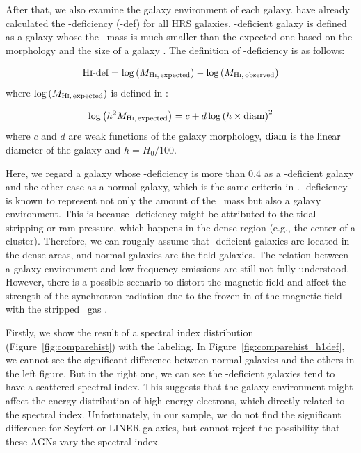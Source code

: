 After that, we also examine the galaxy environment of each galaxy.
\citet{Boselli2014} have already calculated the \nh-deficiency (\nh-def) for all HRS galaxies.
\nh-deficient galaxy is defined as a galaxy whose the \nh~mass is much smaller than the expected one based on the morphology and the size of a galaxy \citep{Haynes1984, Boselli2009}.
The definition of \nh-deficiency is as follows:

\begin{equation}\label{eq:definitionofHIdeficiency}
    \text{H\textsc{i}-def} = \log\left(M_{\mathrm{H\textsc{i},\,expected}}\right) - \log\left(M_{\mathrm{H\textsc{i},\,observed}}\right)
\end{equation}
where $\log\left(M_{\mathrm{H\textsc{i},\,expected}}\right)$ is defined in \citet{Haynes1984}:

\begin{equation}\label{eq:definitionofexpectedHIdef}
    \log\left(h^2 M_{\mathrm{H\textsc{i},\,expected}}\right) = c + d\log\left(h\times\mathrm{diam}\right)^2
\end{equation}
where $c$ and $d$ are weak functions of the galaxy morphology, $\mathrm{diam}$ is the linear diameter of the galaxy and $h=H_0 / 100$.

Here, we regard a galaxy whose \nh-deficiency is more than 0.4 as a \nh-deficient galaxy and the other case as a normal galaxy, which is the same criteria in \citet{Ciesla2016}.
\nh-deficiency is known to represent not only the amount of the \nh~mass but also a galaxy environment.
This is because \nh-deficiency might be attributed to the tidal stripping or ram pressure, which happens in the dense region (e.g., the center of a cluster).
Therefore, we can roughly assume that \nh-deficient galaxies are located in the dense areas, and normal galaxies are the field galaxies.
The relation between a galaxy environment and low-frequency emissions are still not fully understood.
However, there is a possible scenario to distort the magnetic field and affect the strength of the synchrotron radiation due to the frozen-in of the magnetic field with the stripped \nh~gas \citep{Murphy2009}.

Firstly, we show the result of a spectral index distribution (Figure~\ref{fig:comparehist}) with the labeling.
In Figure~\ref{fig:comparehist_h1def}, we cannot see the significant difference between normal galaxies and the others in the left figure.
But in the right one, we can see the \nh-deficient galaxies tend to have a scattered spectral index.
This suggests that the galaxy environment might affect the energy distribution of high-energy electrons, which directly related to the spectral index.
Unfortunately, in our sample, we do not find the significant difference for Seyfert or LINER galaxies, but cannot reject the possibility that these AGNs vary the spectral index.

